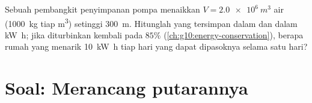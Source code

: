\begin{exercise}[$\star\star\star$]\label{exo:g11:mechanical-energy:15}
Sebuah pembangkit penyimpanan pompa menaikkan
$V = \qty{2.0e6}{m^3}$ air (\qty{1000}{kg} tiap \unit{m^3}) setinggi
\qty{300}{m}. Hitunglah  yang tersimpan dalam  dan dalam
\unit{kW.h}; jika diturbinkan kembali pada  $85\%$
(\cref{ch:g10:energy-conservation}), berapa rumah yang menarik
\qty{10}{kW.h} tiap hari yang dapat dipasoknya selama satu hari?
\end{exercise}

\section{Soal: Merancang putarannya}

